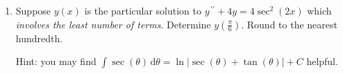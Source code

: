 \documentclass{ximera}
\begin{document}
\begin{enumerate}[label=(\arabic*)]


\item Suppose $y(x)$ is the particular solution to $y^{\,\prime\prime}+4y=4\sec^2(2x)$ which \emph{involves the least number of terms}.  Determine $\displaystyle y\left(\frac{\pi}{6}\right)$.  Round to the nearest hundredth.



Hint: you may find $\displaystyle \int \sec (\theta)\, \mathrm{d}\theta=\ln \left|\sec (\theta)+\tan (\theta)\right|+C$ helpful.

\end{enumerate}
\end{document}
